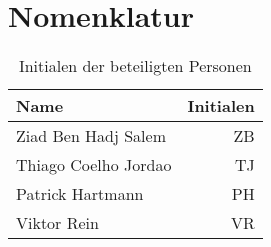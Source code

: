 \chapter*{Nomenklatur}





\begin{table}[h] 
	\centering 
	\begin{tabular}{lr} 
		
		Name & \hspace{0.5cm} Initialen\\ 
		\hline 
		Ziad Ben Hadj Salem & ZB\\
		Thiago Coelho Jordao & TJ\\
		Patrick Hartmann & PH\\
		Viktor Rein & VR\\
		\hline
		
	\end{tabular} 
	\caption{Initialen der beteiligten Personen} 
	\label{tab:initialien} 
\end{table} 
